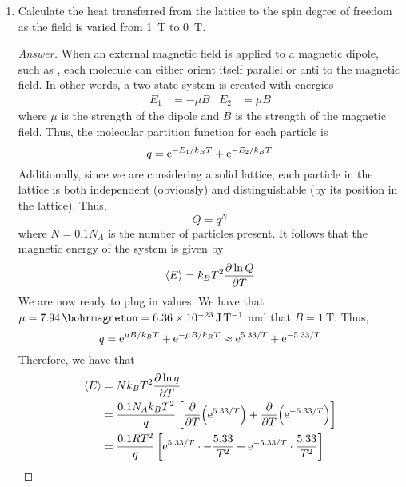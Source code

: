 \documentclass[../psets.tex]{subfiles}
\begin{document}
\begin{enumerate}
\begin{enumerate}
        \item Calculate the heat transferred from the lattice to the spin degree of freedom as the field is varied from \SI{1}{\tesla} to \SI{0}{\tesla}.
        \begin{proof}[Answer]
            When an external magnetic field is applied to a magnetic dipole, such as , each molecule can either orient itself parallel or anti to the magnetic field. In other words, a two-state system is created with energies
            \begin{align*}
                E_1 &= -\mu B&
                E_2 &= \mu B
            \end{align*}
            where $\mu$ is the strength of the dipole and $B$ is the strength of the magnetic field. Thus, the molecular partition function for each particle is
            \begin{equation*}
                q = \e[-E_1/k_BT]+\e[-E_2/k_BT]
            \end{equation*}
            Additionally, since we are considering a solid lattice, each particle in the lattice is both independent (obviously) and distinguishable (by its position in the lattice). Thus,
            \begin{equation*}
                Q = q^N
            \end{equation*}
            where $N=0.1N_A$ is the number of  particles present. It follows that the magnetic energy of the system is given by
            \begin{equation*}
                \prb{E} = k_BT^2\pdv{\ln Q}{T}
            \end{equation*}
            We are now ready to plug in values. We have that $\mu=\SI{7.94}{\bohrmagneton}=\SI{6.36e-23}{\joule\per\tesla}$ and that $B=\SI{1}{\tesla}$. Thus,
            \begin{equation*}
                q = \e[\mu B/k_BT]+\e[-\mu B/k_BT]
                \approx \e[5.33/T]+\e[-5.33/T]
            \end{equation*}
            Therefore, we have that
            \begin{align*}
                \prb{E} &= Nk_BT^2\pdv{\ln q}{T}\\
                &= \frac{0.1N_Ak_BT^2}{q}\left[ \pdv{T}(\e[5.33/T])+\pdv{T}(\e[-5.33/T]) \right]\\
                &= \frac{0.1RT^2}{q}\left[ \e[5.33/T]\cdot-\frac{5.33}{T^2}+\e[-5.33/T]\cdot\frac{5.33}{T^2} \right]\\

\end{align*}
\end{proof}
\end{enumerate}
\end{enumerate}
\end{document}
